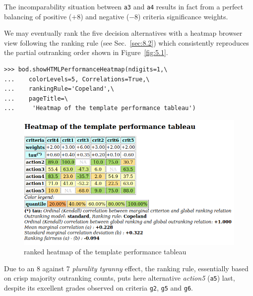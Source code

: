The incomparability situation between \texttt{a3} and \texttt{a4} results in fact from a perfect balancing of positive ($+8$) and negative ($-8$) criteria significance weights.

We may eventually rank the five decision alternatives with a heatmap browser view following the \Copeland ranking rule (see Sec.~\ref{sec:8.2}) which consistently reproduces the partial outranking order shown in Figure~\vref{fig:5.1}. 
\begin{lstlisting}
>>> bod.showHTMLPerformanceHeatmap(ndigits=1,\
...    colorLevels=5, Correlations=True,\
...    rankingRule='Copeland',\
...    pageTitle=\
...     'Heatmap of the template performance tableau')
\end{lstlisting}
\begin{figure}[ht]
\includegraphics[width=\hsize]{Figures/5-2-templateHeatmapCop.png}
\caption{\Copeland ranked heatmap of the template performance tableau}
\label{fig:5.2}       %
\end{figure}

Due to an 8 against 7 \emph{plurality tyranny} effect, the \Copeland ranking rule, essentially based on crisp majority outranking counts, puts here alternative \emph{action5} (\texttt{a5}) last, despite its excellent grades observed on criteria \texttt{g2}, \texttt{g5} and \texttt{g6}.

